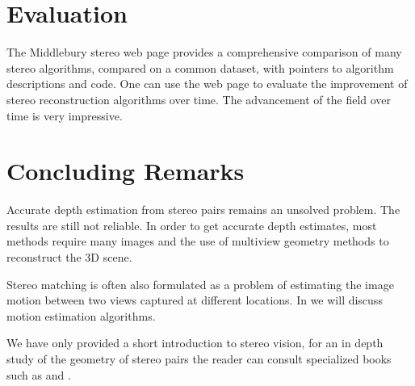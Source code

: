 
















\section{Evaluation}

The Middlebury stereo web page \cite{Scharstein2002} provides a comprehensive comparison of many stereo algorithms, compared on a common dataset, with pointers to algorithm descriptions and code.  One can use the web page to evaluate the improvement of stereo reconstruction algorithms over time.  The advancement of the field over time is very impressive.


\section{Concluding Remarks}

Accurate depth estimation from stereo pairs remains an unsolved problem. The results are still not reliable. In order to get accurate depth estimates, most methods require many images and the use of multiview geometry methods to reconstruct the 3D scene.

Stereo matching is often also formulated as a problem of estimating the image motion between two views captured at different locations. In \chap{\ref{chapter:motion_estimation}} we will discuss motion estimation algorithms.

We have only provided a short introduction to stereo vision, for an in depth study of the geometry of stereo pairs the reader can consult specialized books such as \cite{Hartley2004} and \cite{Faugeras93}.

